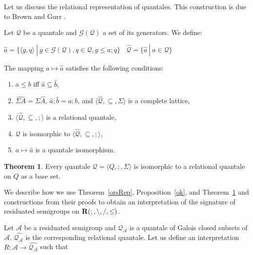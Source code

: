 \documentclass[a4paper]{article}
\theoremstyle{definition}
\theoremstyle{theorem}
\newtheorem{theorem}{Theorem}
\theoremstyle{proposition}
\theoremstyle{lemma}
\theoremstyle{ex}
\theoremstyle{corollary}
\theoremstyle{claim}
\begin{document}
Let us discuss the relational representation of quantales. This construction is due to Brown and Gurr \cite{brown1993representation}.

Let $\mathcal{Q}$ be a quantale and $\mathcal{G}(\mathcal{Q})$ a set of its generators. We define:

\begin{center}
  $\hat{a} = \{ \langle g, q \rangle \: | \: g \in \mathcal{G}(\mathcal{Q}), q \in \mathcal{Q}, g \leq a ; q \} \:\:\:\: \widehat{\mathcal{Q}} = \{ \hat{a} \: | \: a \in \mathcal{Q} \}$
\end{center}

The mapping $a \mapsto \hat{a}$ satisfies the following conditions:

\begin{enumerate}
\item $a \leq b$ iff $\hat{a} \subseteq \hat{b}$,

\item $\widehat{\Sigma A} = \Sigma \widehat{A}$, $\hat{a} ; \hat{b} = \widehat{a ; b}$, and $\langle \widehat{\mathcal{Q}}, \subseteq, \Sigma \rangle$ is a complete lattice,

\item $\langle \widehat{\mathcal{Q}}, \subseteq, ; \rangle$ is a relational quantale,

\item $\mathcal{Q}$ is isomorphic to $\langle \widehat{\mathcal{Q}}, \subseteq, ; \rangle$,

\item $a \mapsto \hat{a}$ is a quantale isomorphism.
\end{enumerate}

\begin{theorem} \label{quantaleRep}
  Every quantale $\mathcal{Q} = \langle Q, ;, \Sigma \rangle$ is isomorphic to a relational quantale on $Q$ as a base set.
\end{theorem}

We describe how we use Theorem~\ref{orsRep}, Proposition~\ref{ok}, and Theorem~\ref{quantaleRep} and constructions from their proofs to obtain an interpretation of the signature of residuated semigroups on ${\bf R}(;, \setminus, /, \leq)$.

Let $\mathcal{A}$ be a residuated semigroup and $\mathcal{Q}_{\mathcal{A}}$ is a quantale of Galois closed subsets of $\mathcal{A}$. $\widehat{\mathcal{Q}_{\mathcal{A}}}$ is the corresponding relational quantale. Let us define an interpretation $R : \mathcal{A} \to \widehat{\mathcal{Q}_{\mathcal{A}}}$ such that
\end{document}
